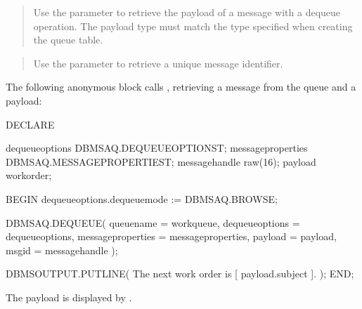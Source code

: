 \documentclass[letterpaper,10pt,english,openany,oneside]{sphinxmanual}
\begin{document}
\begin{quote}

Use the  parameter to retrieve the payload of a message
with a dequeue operation. The payload type must match the type
specified when creating the queue table.
\end{quote}

\begin{quote}

Use the  parameter to retrieve a unique message identifier.
\end{quote}


The following anonymous block calls , retrieving a
message from the queue and a payload:

%
\begin{sphinxVerbatim}[commandchars=\\\{\}]
DECLARE

  dequeue\PYGZus{}options    DBMS\PYGZus{}AQ.DEQUEUE\PYGZus{}OPTIONS\PYGZus{}T;
  message\PYGZus{}properties DBMS\PYGZus{}AQ.MESSAGE\PYGZus{}PROPERTIES\PYGZus{}T;
  message\PYGZus{}handle     raw(16);
  payload            work\PYGZus{}order;

BEGIN
  dequeue\PYGZus{}options.dequeue\PYGZus{}mode := DBMS\PYGZus{}AQ.BROWSE;

  DBMS\PYGZus{}AQ.DEQUEUE(
    queue\PYGZus{}name         =\PYGZgt{} \PYGZsq{}work\PYGZus{}queue\PYGZsq{},
    dequeue\PYGZus{}options    =\PYGZgt{} dequeue\PYGZus{}options,
    message\PYGZus{}properties =\PYGZgt{} message\PYGZus{}properties,
    payload            =\PYGZgt{} payload,
    msgid              =\PYGZgt{} message\PYGZus{}handle
  );

  DBMS\PYGZus{}OUTPUT.PUT\PYGZus{}LINE(
  \PYGZsq{}The next work order is [\PYGZsq{} \textbar{}\textbar{} payload.subject \textbar{}\textbar{} \PYGZsq{}].\PYGZsq{}
  );
END;
\end{sphinxVerbatim}

The payload is displayed by .

\newpage

\ignorespaces 
\end{document}
